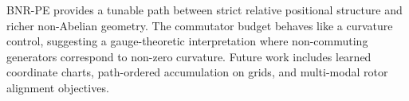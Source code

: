 BNR-PE provides a tunable path between strict relative positional structure and richer non-Abelian geometry.
The commutator budget behaves like a curvature control, suggesting a gauge-theoretic interpretation where non-commuting generators correspond to non-zero curvature.
Future work includes learned coordinate charts, path-ordered accumulation on grids, and multi-modal rotor alignment objectives.
